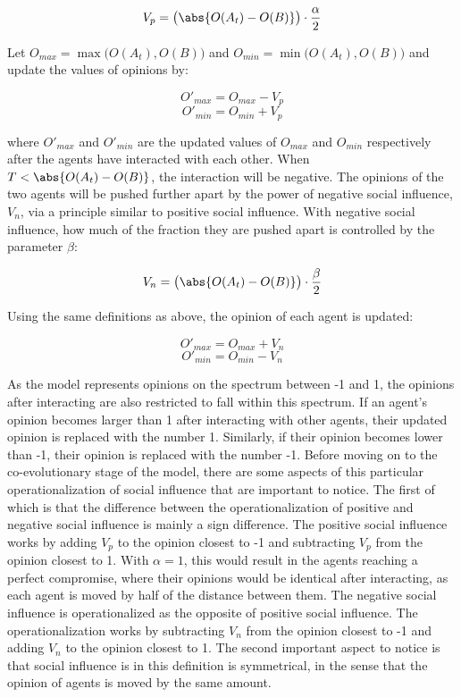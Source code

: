 \documentclass[11pt]{article}
\DeclarePairedDelimiter{\abs}\lvert\rvert
\begin{document}
$$V_p = \big(\abs{O(A_t) - O(B)}\big) \cdot \frac{\alpha}{2}$$

Let $O_{max} = \max \big(O(A_t), O(B)\big)$ and $O_{min} = \min \big(O(A_t), O(B)\big)$ and update the values of opinions by:

$$O'_{max} = O_{max} - V_p$$
$$O'_{min} = O_{min} + V_p$$

where $O'_{max}$ and $O'_{min}$ are the updated values of $O_{max}$ and $O_{min}$ respectively after the agents have interacted with each other. When $T < \abs{O(A_t) - O(B)}$, the interaction will be negative. The opinions of the two agents will be pushed further apart by the power of negative social influence, $V_n$, via a principle similar to positive social influence. With negative social influence, how much of the fraction they are pushed apart is controlled by the parameter $\beta$: 

$$V_n = \big(\abs{O(A_t) - O(B)}\big) \cdot \frac{\beta}{2}$$

Using the same definitions as above, the opinion of each agent is updated:

$$O'_{max} = O_{max} + V_n$$
$$O'_{min} = O_{min} - V_n$$

\noindent As the model represents opinions on the spectrum between -1 and 1, the opinions after interacting are also restricted to fall within this spectrum. If an agent's opinion becomes larger than 1 after interacting with other agents, their updated opinion is replaced with the number 1. Similarly, if their opinion becomes lower than -1, their opinion is replaced with the number -1. Before moving on to the co-evolutionary stage of the model, there are some aspects of this particular operationalization of social influence that are important to notice. 
The first of which is that the difference between the operationalization  of positive and negative social influence is mainly a sign difference. The positive social influence works by adding $V_p$ to the opinion closest to -1 and subtracting $V_p$ from the opinion closest to 1. With $\alpha = 1$, this would result in the agents reaching a perfect compromise, where their opinions would be identical after interacting, as each agent is moved by half of the distance between them. The negative social influence is operationalized as the opposite of positive social influence. The operationalization works by subtracting $V_n$ from the opinion closest to -1 and adding $V_n$ to the opinion closest to 1. 
The second important aspect to notice is that social influence is in this definition is symmetrical, in the sense that the opinion of agents is moved by the same amount. 
\end{document}
